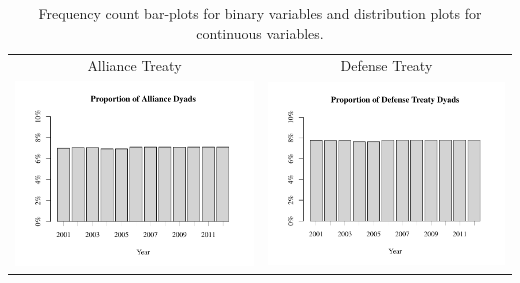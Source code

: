 \documentclass[reqno,onecolumn,letterpaper,12pt]{article}
\begin{document}
\clearpage

\begin{longtable}{c@{\hskip -.8cm}c}
\caption{\label{fig:sum_stats} Frequency count bar-plots for binary variables and distribution plots for continuous variables.}\\

Alliance Treaty &Defense Treaty\\
\includegraphics[height=.17\textheight, clip=true, trim=0cm 1cm 0cm 2cm]{SI_figures/descriptive_plots/alliance_barplot.pdf}    &
\includegraphics[height=.17\textheight, clip=true, trim=0cm 1cm 0cm 2cm]{SI_figures/descriptive_plots/defense_barplot.pdf}   \\


\end{longtable}
\end{document}
